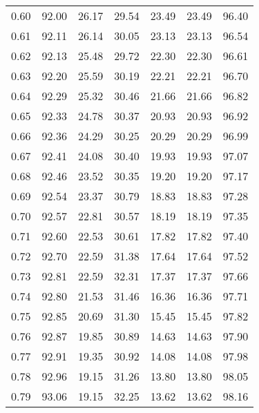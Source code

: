 \begin{tabular}{|c|c|c|c|c|c|c|}
      0.60 &     92.00 &     26.17 &      29.54 &   23.49 &      23.49 &         96.40 \\
      0.61 &     92.11 &     26.14 &      30.05 &   23.13 &      23.13 &         96.54 \\
      0.62 &     92.13 &     25.48 &      29.72 &   22.30 &      22.30 &         96.61 \\
      0.63 &     92.20 &     25.59 &      30.19 &   22.21 &      22.21 &         96.70 \\
      0.64 &     92.29 &     25.32 &      30.46 &   21.66 &      21.66 &         96.82 \\
      0.65 &     92.33 &     24.78 &      30.37 &   20.93 &      20.93 &         96.92 \\
      0.66 &     92.36 &     24.29 &      30.25 &   20.29 &      20.29 &         96.99 \\
      0.67 &     92.41 &     24.08 &      30.40 &   19.93 &      19.93 &         97.07 \\
      0.68 &     92.46 &     23.52 &      30.35 &   19.20 &      19.20 &         97.17 \\
      0.69 &     92.54 &     23.37 &      30.79 &   18.83 &      18.83 &         97.28 \\
      0.70 &     92.57 &     22.81 &      30.57 &   18.19 &      18.19 &         97.35 \\
      0.71 &     92.60 &     22.53 &      30.61 &   17.82 &      17.82 &         97.40 \\
      0.72 &     92.70 &     22.59 &      31.38 &   17.64 &      17.64 &         97.52 \\
      0.73 &     92.81 &     22.59 &      32.31 &   17.37 &      17.37 &         97.66 \\
      0.74 &     92.80 &     21.53 &      31.46 &   16.36 &      16.36 &         97.71 \\
      0.75 &     92.85 &     20.69 &      31.30 &   15.45 &      15.45 &         97.82 \\
      0.76 &     92.87 &     19.85 &      30.89 &   14.63 &      14.63 &         97.90 \\
      0.77 &     92.91 &     19.35 &      30.92 &   14.08 &      14.08 &         97.98 \\
      0.78 &     92.96 &     19.15 &      31.26 &   13.80 &      13.80 &         98.05 \\
      0.79 &     93.06 &     19.15 &      32.25 &   13.62 &      13.62 &         98.16 \\

\end{tabular}
